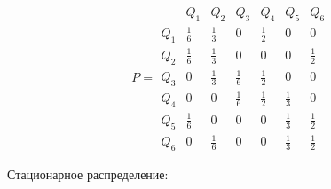 \[
	P =
	\begin{array}{c|cccccc}
		    & Q_1          & Q_2          & Q_3          & Q_4          & Q_5          & Q_6          \\
		\hline
		Q_1 & \tfrac{1}{6} & \tfrac{1}{3} & 0            & \tfrac{1}{2} & 0            & 0            \\
		Q_2 & \tfrac{1}{6} & \tfrac{1}{3} & 0            & 0            & 0            & \tfrac{1}{2} \\
		Q_3 & 0            & \tfrac{1}{3} & \tfrac{1}{6} & \tfrac{1}{2} & 0            & 0            \\
		Q_4 & 0            & 0            & \tfrac{1}{6} & \tfrac{1}{2} & \tfrac{1}{3} & 0            \\
		Q_5 & \tfrac{1}{6} & 0            & 0            & 0            & \tfrac{1}{3} & \tfrac{1}{2} \\
		Q_6 & 0            & \tfrac{1}{6} & 0            & 0            & \tfrac{1}{3} & \tfrac{1}{2}
	\end{array}
\]



Стационарное распределение:

